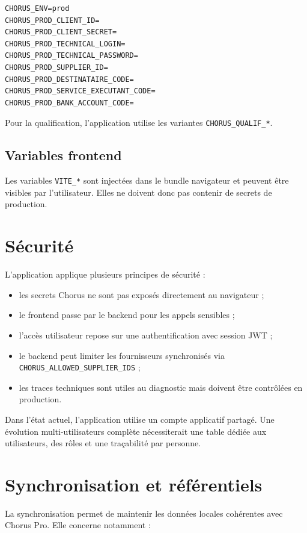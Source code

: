 \documentclass[11pt,a4paper]{article}
\begin{document}
\begin{lstlisting}
CHORUS_ENV=prod
CHORUS_PROD_CLIENT_ID=
CHORUS_PROD_CLIENT_SECRET=
CHORUS_PROD_TECHNICAL_LOGIN=
CHORUS_PROD_TECHNICAL_PASSWORD=
CHORUS_PROD_SUPPLIER_ID=
CHORUS_PROD_DESTINATAIRE_CODE=
CHORUS_PROD_SERVICE_EXECUTANT_CODE=
CHORUS_PROD_BANK_ACCOUNT_CODE=
\end{lstlisting}

Pour la qualification, l'application utilise les variantes
\texttt{CHORUS\_QUALIF\_*}.

\subsection{Variables frontend}

Les variables \texttt{VITE\_*} sont injectées dans le bundle navigateur et peuvent
être visibles par l'utilisateur. Elles ne doivent donc pas contenir de secrets de
production.

\section{Sécurité}

L'application applique plusieurs principes de sécurité :

\begin{itemize}
  \item les secrets Chorus ne sont pas exposés directement au navigateur ;
  \item le frontend passe par le backend pour les appels sensibles ;
  \item l'accès utilisateur repose sur une authentification avec session JWT ;
  \item le backend peut limiter les fournisseurs synchronisés via
        \texttt{CHORUS\_ALLOWED\_SUPPLIER\_IDS} ;
  \item les traces techniques sont utiles au diagnostic mais doivent être
        contrôlées en production.
\end{itemize}

Dans l'état actuel, l'application utilise un compte applicatif partagé. Une
évolution multi-utilisateurs complète nécessiterait une table dédiée aux
utilisateurs, des rôles et une traçabilité par personne.

\section{Synchronisation et référentiels}

La synchronisation permet de maintenir les données locales cohérentes avec
Chorus Pro. Elle concerne notamment :
\end{document}
